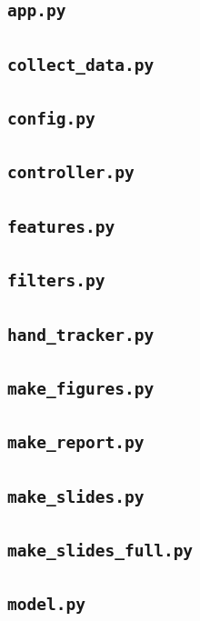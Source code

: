 \subsection*{\texttt{app.py}}

\subsection*{\texttt{collect\_data.py}}

\subsection*{\texttt{config.py}}

\subsection*{\texttt{controller.py}}

\subsection*{\texttt{features.py}}

\subsection*{\texttt{filters.py}}

\subsection*{\texttt{hand\_tracker.py}}

\subsection*{\texttt{make\_figures.py}}

\subsection*{\texttt{make\_report.py}}

\subsection*{\texttt{make\_slides.py}}

\subsection*{\texttt{make\_slides\_full.py}}

\subsection*{\texttt{model.py}}

